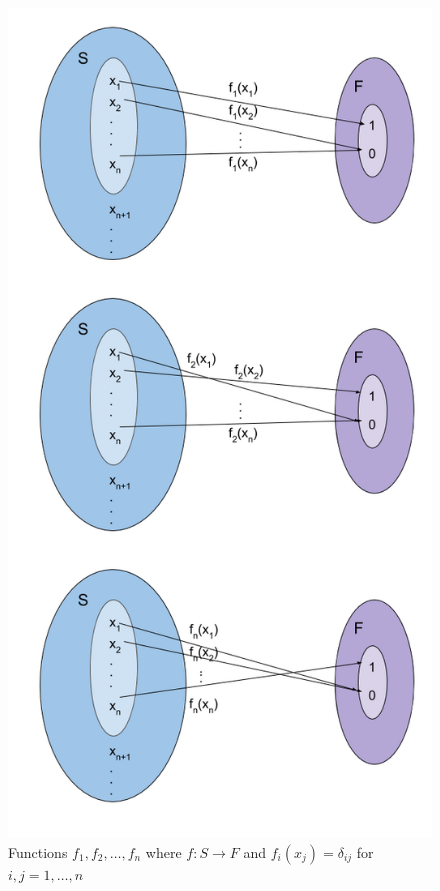 \begin{figure}[h!]
\centering
\includegraphics[width=\columnwidth]{solutions/3/6/3/fig/f.png}
\caption{Functions $f_1,f_2,\dots,f_n$ where $f:S \rightarrow F$ and $f_i(x_j) = \delta_{ij}$ for $i,j=1,\dots,n$}
\label{eq:solutions/3/6/3/fig/2}
\end{figure}

